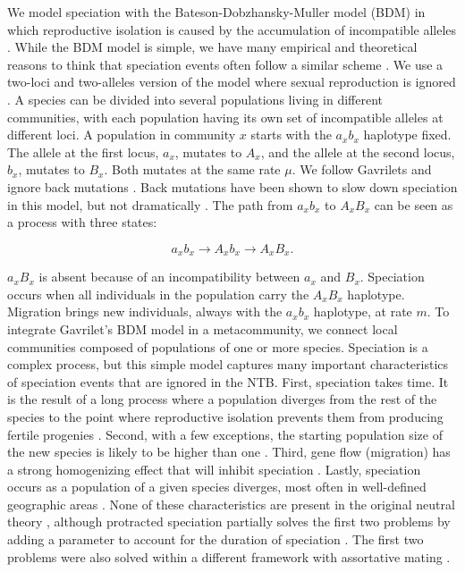 \documentclass[letterpaper,twocolumn,superscriptaddress,showkeys]{revtex4}
\begin{document}
We model speciation with the Bateson-Dob\-zhan\-sky-Muller model (BDM) in which reproductive isolation is caused by the accumulation of incompatible alleles \cite{bat09,dob37,mul42,orr96b,orr01}. While the BDM model is simple, we have many empirical and theoretical reasons to think that speciation events often follow a similar scheme \cite{gav03,coy04}. We use a two-loci and two-alleles version of the model where sexual reproduction is ignored \cite[p. 131]{gav04}. A species can be divided into several populations living in different communities, with each population having its own set of incompatible alleles at different loci. A population in community $x$ starts with the $a_xb_x$ haplotype fixed. The allele at the first locus, $a_x$, mutates to $A_x$, and the allele at the second locus, $b_x$, mutates to $B_x$. Both mutates at the same rate $\mu$. We follow Gavrilets and ignore back mutations \cite{gav04}. Back mutations have been shown to slow down speciation in this model, but not dramatically \cite[p. 131]{gav04}. The path from $a_xb_x$ to $A_xB_x$ can be seen as a process with three states: 

\begin{equation}\label{state}
	a_xb_x \longrightarrow A_xb_x \longrightarrow A_xB_x.
\end{equation}

$a_xB_x$ is absent because of an incompatibility between $a_x$ and $B_x$. Speciation occurs when all individuals in the population carry the $A_xB_x$ haplotype. Migration brings new individuals, always with the $a_xb_x$ haplotype, at rate $m$. To integrate Gavrilet's BDM model in a metacommunity, we connect local communities composed of populations of one or more species. Speciation is a complex process, but this simple model captures many important characteristics of speciation events that are ignored in the NTB. First, speciation takes time. It is the result of a long process where a population diverges from the rest of the species to the point where reproductive isolation prevents them from producing fertile progenies \cite{coy04}. Second, with a few exceptions, the starting population size of the new species is likely to be higher than one \cite{gav04,ros10}. Third, gene flow (migration) has a strong homogenizing effect that will inhibit speciation \cite{coy04,fit08}. Lastly, speciation occurs as a population of a given species diverges, most often in well-defined geographic areas \cite{avi00,coy04}. None of these characteristics are present in the original neutral theory \cite{hub01}, although protracted speciation partially solves the first two problems by adding a parameter to account for the duration of speciation \cite{ros10}. The first two problems were also solved within a different framework with assortative mating \cite{dea09,mel10}.
\end{document}

